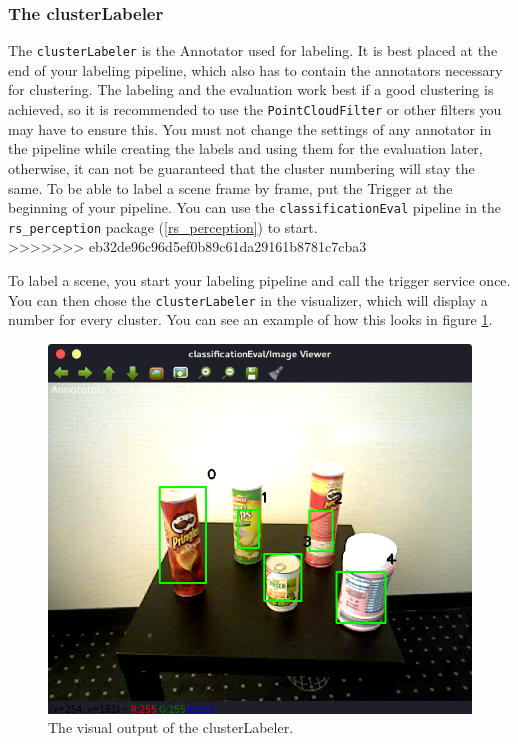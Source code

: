 \documentclass[main.tex]{subfiles}
\begin{document}
\subsubsection{The clusterLabeler}
The \texttt{clusterLabeler} is the Annotator used for labeling. It is best placed at the end of your labeling pipeline, which also has to contain the annotators necessary for clustering. The labeling and the evaluation work best if a good clustering is achieved, so it is recommended to use the \texttt{PointCloudFilter} or other filters you may have to ensure this. You must not change the settings of any annotator in the pipeline while creating the labels and using them for the evaluation later, otherwise, it can not be guaranteed that the cluster numbering will stay the same. To be able to label a scene frame by frame, put the Trigger at the beginning of your pipeline. You can use the \texttt{classificationEval} pipeline in the \texttt{rs\_perception} package (\ref{rs_perception}) to start.\\
>>>>>>> eb32de96c96d5ef0b89c61da29161b8781c7cba3

To label a scene, you start your labeling pipeline and call the trigger service once. You can then chose the \texttt{clusterLabeler} in the visualizer, which will display a number for every cluster. You can see an example of how this looks in figure \ref{fig:clusterLabeler visualization}.
\begin{figure}
  \includegraphics[width=\linewidth]{pictures/perception/cluster_numbering.png}
  \caption{The visual output of the clusterLabeler.}
  \label{fig:clusterLabeler visualization}
\end{figure}
\end{document}
